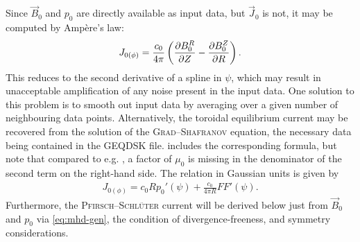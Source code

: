 Since $\vec{B}_{0}$ and $p_{0}$ are directly available as input data, but $\vec{J}_{0}$ is not, it may be computed by Ampère's law:
\begin{gather}
  J_{0 (\phi)} = \frac{c_{0}}{4 \pi} \left ( \pd[B_{0}^{R}]{Z} - \pd[B_{0}^{Z}]{R} \right ).
\end{gather}
This reduces to the second derivative of a spline in $\psi$, which may result in unacceptable amplification of any noise present in the input data. One solution to this problem is to smooth out input data by averaging over a given number of neighbouring data points. Alternatively, the toroidal equilibrium current may be recovered from the solution of the \textsc{Grad}--\textsc{Shafranov} equation, the necessary data being contained in the GEQDSK file. \textcite{Lao97} includes the corresponding formula, but note that compared to e.g. \textcite{Freidberg14}, a factor of $\mu_{0}$ is missing in the denominator of the second term on the right-hand side. The relation in Gaussian units is given by
\begin{gather}
  J_{0 (\phi)} = c_{0} R p_{0}'(\psi) + \frac{c_{0}}{4 \pi R} F F'(\psi).
\end{gather}
Furthermore, the \textsc{Pfirsch}--\textsc{Schlüter} current will be derived below just from $\vec{B}_{0}$ and $p_{0}$ via \cref{eq:mhd-gen}, the condition of divergence-freeness, and symmetry considerations.

